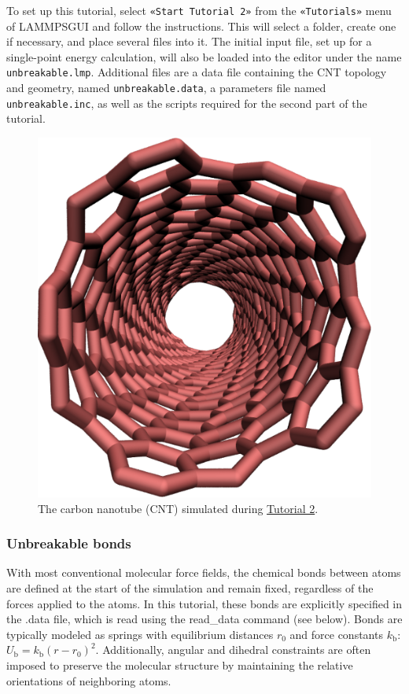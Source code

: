\documentclass[9pt,tutorial]{livecoms}
\newcommand{\lmpcmd}[1]{\hspace{0pt}\colorbox{listing}{\textcolor{command}{\small{#1}}}\hspace{0pt}} %
\newcommand{\flecmd}[1]{\textcolor{command}{\texttt{#1}}} %
\newcommand{\guicmd}[1]{\textcolor{command}{\texttt{«#1»}}} %
\newcommand{\lammpsgui}{\textsf{LAMMPS\textendash GUI}}
\begin{document}
To set up this tutorial, select \guicmd{Start Tutorial 2} from the
\guicmd{Tutorials} menu of \lammpsgui{} and follow the instructions.
This will select a folder, create one if necessary, and place several
files into it.  The initial input file, set up for a single-point energy
calculation, will also be loaded into the editor under the name
\flecmd{unbreakable.lmp}.  Additional files are a data file containing
the CNT topology and geometry, named \flecmd{unbreakable.data}, a
parameters file named \flecmd{unbreakable.inc}, as well as the scripts
required for the second part of the tutorial.

\begin{figure}
\centering
\includegraphics[width=0.55\linewidth]{CNT}
\caption{The carbon nanotube (CNT) simulated during
\hyperref[carbon-nanotube-label]{Tutorial 2}.}
\label{fig:CNT}
\end{figure}

\subsubsection{Unbreakable bonds}

With most conventional molecular force fields, the chemical bonds between
atoms are defined at the start of the simulation and remain fixed, regardless
of the forces applied to the atoms.  {\color{blue}In this tutorial, these bonds
are explicitly specified in the \lmpcmd{.data} file, which is read using the \lmpcmd{read\_data} command (see below).}
Bonds are typically modeled as springs
with equilibrium distances $r_0$ and force constants $k_\text{b}$:
$U_\text{b} = k_\text{b} \left( r - r_0 \right)^2$.  Additionally, angular and
dihedral constraints are often imposed to preserve the molecular structure
by maintaining the relative orientations of neighboring atoms.
\end{document}
